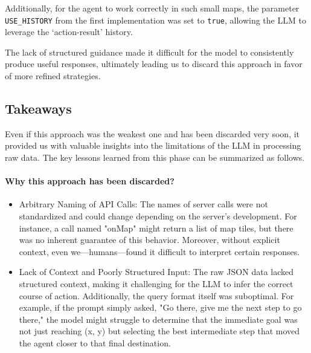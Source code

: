 Additionally, for the agent to work correctly in such small maps, the parameter
\texttt{USE\_HISTORY} from the first implementation was set to \texttt{true}, allowing
the LLM to leverage the `action-result' history.

The lack of structured guidance made it difficult for the model to consistently produce
useful responses, ultimately leading us to discard this approach in favor of
more refined strategies.

\subsection{Takeaways}

Even if this approach was the weakest one and has been discarded very soon, it
provided us with valuable insights into the limitations of the LLM in processing
raw data. The key lessons learned from this phase can be summarized as follows.

\paragraph{Why this approach has been discarded?}
\begin{itemize}
  \item Arbitrary Naming of API Calls: The names of server calls were not
    standardized and could change depending on the server's development. For instance,
    a call named "onMap" might return a list of map tiles, but there was no inherent
    guarantee of this behavior. Moreover, without explicit context, even
    we—humans—found it difficult to interpret certain responses.

  \item Lack of Context and Poorly Structured Input: The raw JSON data lacked
    structured context, making it challenging for the LLM to infer the correct course
    of action. Additionally, the query format itself was suboptimal. For example,
    if the prompt simply asked, "Go there, give me the next step to go there,"
    the model might struggle to determine that the immediate goal was not just
    reaching (x, y) but selecting the best intermediate step that moved the agent
    closer to that final destination.
\end{itemize}

